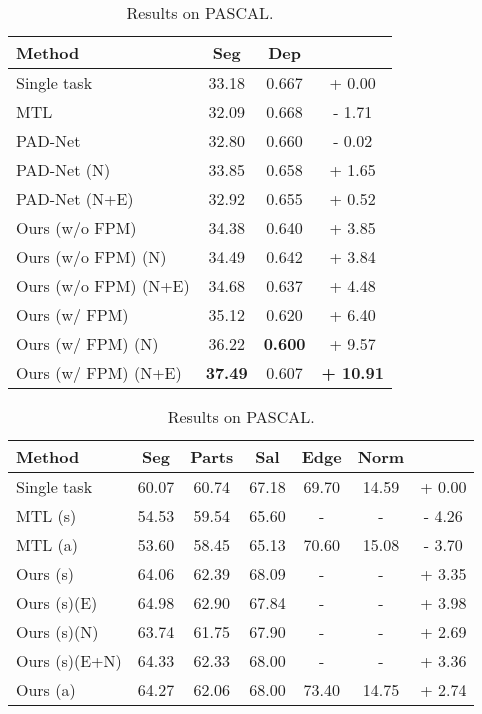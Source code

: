 \documentclass[runningheads]{llncs}
\begin{document}
\begin{table}[t]
    \caption{Ablation studies on (a) NYUD-v2 and (b) PASCAL using an HRNet-18 backbone network. Auxiliary tasks are indicated between brackets.}
    \label{tab: ablation}
    \begin{subtable}[t]{0.45\linewidth}
    \caption{Results on NYUD-v2.}
    \label{tab: nyu_ablation}
    \centering
    \tiny{
    \begin{tabular}{|l|c|c|c|}
    \hline
    Method & Seg  & Dep  &  \\
    \hline
    Single task & 33.18 & 0.667 & + 0.00 \\
    MTL & 32.09 & 0.668 & - 1.71 \\
    PAD-Net & 32.80 & 0.660 & - 0.02 \\
    PAD-Net (N) & 33.85 & 0.658 & + 1.65 \\
    PAD-Net (N+E) & 32.92 & 0.655 & + 0.52 \\
    \hline
    Ours (w/o FPM) & 34.38 & 0.640 & + 3.85 \\
    Ours (w/o FPM) (N) & 34.49 & 0.642 & + 3.84 \\
    Ours (w/o FPM) (N+E) & 34.68 & 0.637 & + 4.48 \\
    \hline
    Ours (w/ FPM) & 35.12 & 0.620 & + 6.40 \\
    Ours (w/ FPM) (N) & 36.22 & \textbf{0.600} & + 9.57 \\
    Ours (w/ FPM) (N+E) & \textbf{37.49} & 0.607 & \textbf{+ 10.91} \\ 
    \hline
    \end{tabular}}
    \end{subtable}
    \begin{subtable}[t]{0.45\linewidth}
    \centering
    \caption{Results on PASCAL.}
    \label{tab: pascal_ablation}
    \tiny{\begin{tabular}{|l|c|c|c|c|c|c|}
    \hline
    Method & Seg  & Parts  & Sal  & Edge  & Norm  &  \\
    \hline
    Single task & 60.07 & 60.74 & 67.18 & 69.70 & 14.59 & + 0.00 \\
    MTL (s) & 54.53 & 59.54 & 65.60 & - & - & - 4.26 \\
    MTL (a) & 53.60 & 58.45 & 65.13 & 70.60 & 15.08 & - 3.70 \\
    \hline
    Ours (s) & 64.06 & 62.39 & 68.09 & - & - & + 3.35 \\
    Ours (s)(E) & 64.98 & 62.90 & 67.84 & - & - & + 3.98 \\
    Ours (s)(N) & 63.74 & 61.75 & 67.90 & - & - & + 2.69 \\
    Ours (s)(E+N) & 64.33 & 62.33 & 68.00 & - & - & + 3.36 \\
    Ours (a) & 64.27 & 62.06 & 68.00 & 73.40 & 14.75 & + 2.74 \\
    \hline
    \end{tabular}}
    \end{subtable}\end{table}
\end{document}
